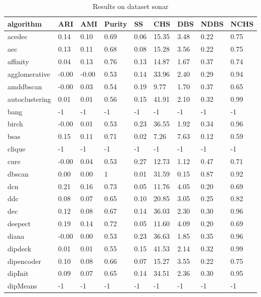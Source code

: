 \begin{table}[H]
\centering
\caption{Results on dataset sonar}
\label{tab:params:sonar}
\begin{tabular}{|l|l|l|l|l|l|l|l|l|}
\hline
algorithm & ARI & AMI & Purity & SS & CHS & DBS & NDBS & NCHS \\
\hline
acedec & 0.14 & 0.10 & 0.69 & 0.06 & 15.35 & 3.48 & 0.22 & 0.75 \\
\hline
aec & 0.13 & 0.11 & 0.68 & 0.08 & 15.28 & 3.56 & 0.22 & 0.75 \\
\hline
affinity & 0.04 & 0.13 & 0.76 & 0.13 & 14.87 & 1.67 & 0.37 & 0.74 \\
\hline
agglomerative & -0.00 & -0.00 & 0.53 & 0.14 & 33.96 & 2.40 & 0.29 & 0.94 \\
\hline
amddbscan & -0.00 & 0.03 & 0.54 & 0.19 & 9.77 & 1.70 & 0.37 & 0.65 \\
\hline
autoclustering & 0.01 & 0.01 & 0.56 & 0.15 & 41.91 & 2.10 & 0.32 & 0.99 \\
\hline
bang & -1 & -1 & -1 & -1 & -1 & -1 & -1 & -1 \\
\hline
birch & -0.00 & 0.01 & 0.53 & 0.23 & 36.55 & 1.92 & 0.34 & 0.96 \\
\hline
bsas & 0.15 & 0.11 & 0.71 & 0.02 & 7.26 & 7.63 & 0.12 & 0.59 \\
\hline
clique & -1 & -1 & -1 & -1 & -1 & -1 & -1 & -1 \\
\hline
cure & -0.00 & 0.04 & 0.53 & 0.27 & 12.73 & 1.12 & 0.47 & 0.71 \\
\hline
dbscan & 0.00 & 0.00 & 1 & 0.01 & 31.59 & 0.15 & 0.87 & 0.92 \\
\hline
dcn & 0.21 & 0.16 & 0.73 & 0.05 & 11.76 & 4.05 & 0.20 & 0.69 \\
\hline
ddc & 0.08 & 0.07 & 0.65 & 0.10 & 20.85 & 3.05 & 0.25 & 0.82 \\
\hline
dec & 0.12 & 0.08 & 0.67 & 0.14 & 36.03 & 2.30 & 0.30 & 0.96 \\
\hline
deepect & 0.19 & 0.14 & 0.72 & 0.05 & 11.60 & 4.09 & 0.20 & 0.69 \\
\hline
diana & -0.00 & 0.00 & 0.53 & 0.23 & 36.63 & 1.85 & 0.35 & 0.96 \\
\hline
dipdeck & 0.01 & 0.01 & 0.55 & 0.15 & 41.53 & 2.14 & 0.32 & 0.99 \\
\hline
dipencoder & 0.10 & 0.08 & 0.66 & 0.07 & 15.27 & 3.55 & 0.22 & 0.75 \\
\hline
dipInit & 0.09 & 0.07 & 0.65 & 0.14 & 34.51 & 2.36 & 0.30 & 0.95 \\
\hline
dipMeans & -1 & -1 & -1 & -1 & -1 & -1 & -1 & -1 \\

\end{tabular}
\end{table}
